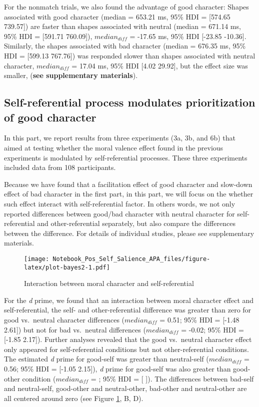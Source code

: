 \documentclass[
  man]{apa6}
\begin{document}
For the nonmatch trials, we also found the advantage of good character: Shapes associated with good character (median = 653.21 ms, 95\% HDI = {[}574.65 739.57{]}) are faster than shapes associated with neutral (median = 671.14 ms, 95\% HDI = {[}591.71 760.09{]}), \(median_{diff}\) = -17.65 ms, 95\% HDI {[}-23.85 -10.36{]}. Similarly, the shapes associated with bad character (median = 676.35 ms, 95\% HDI = {[}599.13 767.76{]}) was responded slower than shapes associated with neutral character, \(median_{diff}\) = 17.04 ms, 95\% HDI {[}4.02 29.92{]}, but the effect size was smaller, (\textbf{see supplementary materials}).

\hypertarget{self-referential-process-modulates-prioritization-of-good-character}{%
\subsection{Self-referential process modulates prioritization of good character}\label{self-referential-process-modulates-prioritization-of-good-character}}

In this part, we report results from three experiments (3a, 3b, and 6b) that aimed at testing whether the moral valence effect found in the previous experiments is modulated by self-referential processes. These three experiments included data from 108 participants.

Because we have found that a facilitation effect of good character and slow-down effect of bad character in the first part, in this part, we will focus on the whether such effect interact with self-referential factor. In others words, we not only reported differences between good/bad character with neutral character for self-referential and other-referential separately, but also compare the differences between the difference. For details of individual studies, please see supplementary materials.

\begin{figure}
\centering
\texttt{[image: Notebook\_Pos\_Self\_Salience\_APA\_files/figure-latex/plot-bayes2-1.pdf]}
\caption{\label{fig:plot-bayes2}Interaction between moral character and self-referential}
\end{figure}

For the \emph{d} prime, we found that an interaction between moral character effect and self-referential, the self- and other-referential difference was greater than zero for good vs.~neutral character differences (\(median_{diff}\) = 0.51; 95\% HDI = {[}-1.48 2.61{]}) but not for bad vs.~neutral differences (\(median_{diff}\) = -0.02; 95\% HDI = {[}-1.85 2.17{]}). Further analyses revealed that the good vs.~neutral character effect only appeared for self-referential conditions but not other-referential conditions. The estimated \emph{d} prime for good-self was greater than neutral-self (\(median_{diff}\) = 0.56; 95\% HDI = {[}-1.05 2.15{]}), \emph{d} prime for good-self was also greater than good-other condition (\(median_{diff}\) = ; 95\% HDI = {[} {]}). The differences between bad-self and neutral-self, good-other and neutral-other, bad-other and neutral-other are all centered around zero (see Figure \ref{fig:plot-bayes2}, B, D).
\end{document}
